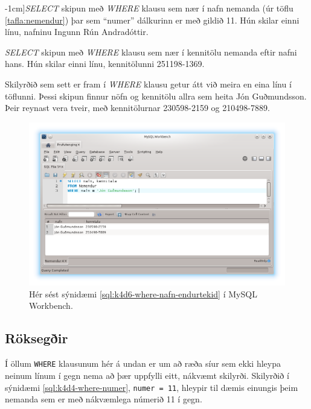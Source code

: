 \begin{example}
\caption[SELECT með WHERE klausu - eftir númeri][-1cm]{\emph{SELECT} skipun með \emph{WHERE} klausu sem nær í nafn nemanda (úr töflu \ref{tafla:nemendur}) þar sem ``numer'' dálkurinn er með gildið 11. Hún skilar einni línu, nafninu Ingunn Rún Andradóttir.}
\label{sql:k4d4-where-numer}
\centering
{}
\end{example}

\begin{example}
\caption[SELECT með WHERE klausu - eftir nafni]{\emph{SELECT} skipun með \emph{WHERE} klausu sem nær í kennitölu nemanda eftir nafni hans. Hún skilar einni línu, kennitölunni 251198-1369.}
\label{sql:k4d5-where-nafn}
\centering
{}
\end{example}

\begin{example}
\caption[SELECT með WHERE klausu - endurtekin gildi]{Skilyrðið sem sett er fram í \emph{WHERE} klausu getur átt við meira en eina línu í töflunni. Þessi skipun finnur nöfn og kennitölu allra sem heita Jón Guðmundsson. Þeir reynast vera tveir, með kennitölurnar 230598-2159 og 210498-7889.}
\label{sql:k4d6-where-nafn-endurtekid}
\centering
{}
\end{example}

\begin{figure}[h]
\caption[Niðurstöður margra dálka SELECT í Workbench]{Hér sést sýnidæmi \ref{sql:k4d6-where-nafn-endurtekid} í MySQL Workbench.}
\label{mynd:workbench-nidurstada-jon}
\centering
\includegraphics[width=\linewidth]{myndir/workbench-nidurstada-jon}
\end{figure}
\subsection{Röksegðir}
\label{undirkafli:roksegdir}
Í öllum \verb|WHERE| klausunum hér á undan er um að ræða síur sem ekki hleypa neinum línum í gegn nema að þær uppfylli eitt, nákvæmt skilyrði. Skilyrðið í sýnidæmi \ref{sql:k4d4-where-numer}, \verb|numer = 11|, hleypir til dæmis einungis þeim nemanda sem er með nákvæmlega númerið 11 í gegn.

